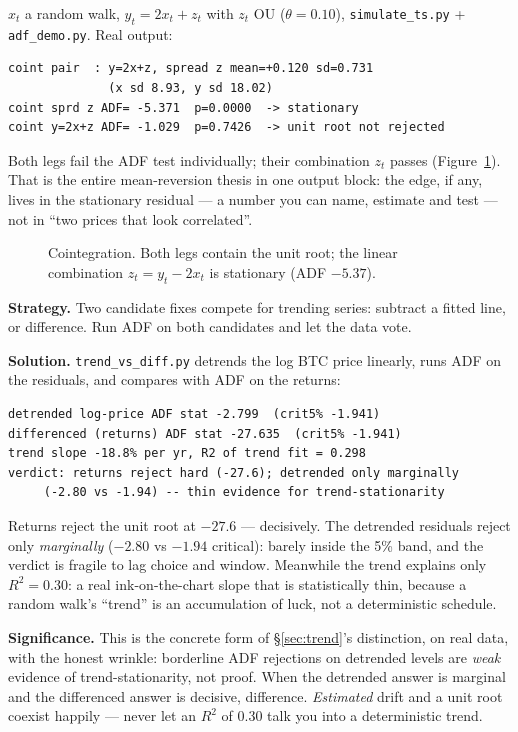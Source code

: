 \begin{example}\label{ex:coint}
$x_t$ a random walk, $y_t=2x_t+z_t$ with $z_t$ OU
($\theta=0.10$), \texttt{simulate\_ts.py} + \texttt{adf\_demo.py}.
Real output:
\begin{lstlisting}[numbers=none]
coint pair  : y=2x+z, spread z mean=+0.120 sd=0.731
              (x sd 8.93, y sd 18.02)
coint sprd z ADF= -5.371  p=0.0000  -> stationary
coint y=2x+z ADF= -1.029  p=0.7426  -> unit root not rejected
\end{lstlisting}
Both legs fail the ADF test individually; their combination $z_t$
passes (Figure~\ref{fig:coint}). That is the entire mean-reversion
thesis in one output block: the edge, if any, lives in the
stationary residual --- a number you can name, estimate and test ---
not in ``two prices that look correlated''.
\end{example}

\begin{figure}[ht]\centering

\caption{Cointegration. Both legs contain the unit root; the linear
combination $z_t=y_t-2x_t$ is stationary (ADF $-5.37$).}
\label{fig:coint}
\end{figure}

\begin{example}\label{ex:trendvsdiff}
\textbf{Strategy.} Two candidate fixes compete for trending series:
subtract a fitted line, or difference. Run ADF on both candidates
and let the data vote.

\textbf{Solution.} \texttt{trend\_vs\_diff.py} detrends the log BTC
price linearly, runs ADF on the residuals, and compares with ADF on
the returns:
\begin{verbatim}
detrended log-price ADF stat -2.799  (crit5% -1.941)
differenced (returns) ADF stat -27.635  (crit5% -1.941)
trend slope -18.8% per yr, R2 of trend fit = 0.298
verdict: returns reject hard (-27.6); detrended only marginally
     (-2.80 vs -1.94) -- thin evidence for trend-stationarity
\end{verbatim}
Returns reject the unit root at $-27.6$ --- decisively. The
detrended residuals reject only \emph{marginally} ($-2.80$ vs
$-1.94$ critical): barely inside the 5\% band, and the verdict is
fragile to lag choice and window. Meanwhile the trend explains
only $R^2=0.30$: a real ink-on-the-chart slope that is statistically
thin, because a random walk's ``trend'' is an accumulation of luck,
not a deterministic schedule.

\textbf{Significance.} This is the concrete form of
\S\ref{sec:trend}'s distinction, on real data, with the honest
wrinkle: borderline ADF rejections on detrended levels are
\emph{weak} evidence of trend-stationarity, not proof. When the
detrended answer is marginal and the differenced answer is
decisive, difference. \emph{Estimated} drift and a unit root
coexist happily --- never let an $R^2$ of 0.30 talk you into a
deterministic trend.
\end{example}

